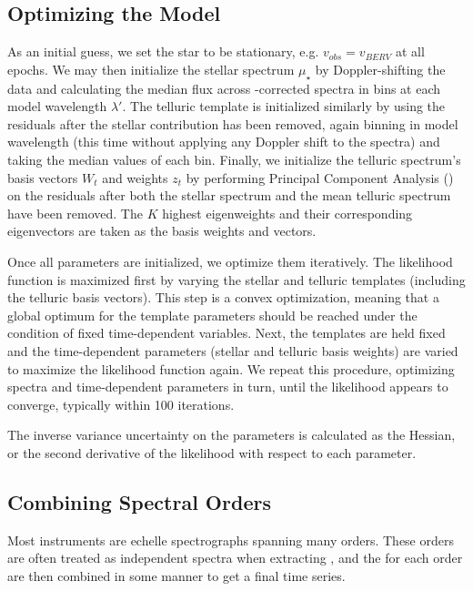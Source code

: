 \documentclass[modern]{aastex62}
\begin{document}
\subsection{Optimizing the Model}
\label{s:optimizing}

As an initial guess, we set the star to be stationary, e.g. $v_{obs} = v_{BERV}$ at all epochs. 
We may then initialize the stellar spectrum $\mu_{\star}$ by Doppler-shifting the data and calculating the median flux across \BERV-corrected spectra in bins at each model wavelength $\lambda'$. 
The telluric template is initialized similarly by using the residuals after the stellar contribution has been removed, again binning in model wavelength (this time without applying any Doppler shift to the spectra) and taking the median values of each bin. 
Finally, we initialize the telluric spectrum's basis vectors $W_t$ and weights $z_t$ by performing Principal Component Analysis () on the residuals after both the stellar spectrum and the mean telluric spectrum have been removed. 
The $K$ highest eigenweights and their corresponding eigenvectors are taken as the basis weights and vectors. 

Once all parameters are initialized, we optimize them iteratively. 
The likelihood function is maximized first by varying the stellar and telluric templates (including the telluric basis vectors). 
This step is a convex optimization, meaning that a global optimum for the template parameters should be reached under the condition of fixed time-dependent variables. 
Next, the templates are held fixed and the time-dependent parameters (stellar \RVs and telluric basis weights) are varied to maximize the likelihood function again. 
We repeat this procedure, optimizing spectra and time-dependent parameters in turn, until the likelihood appears to converge, typically within 100 iterations.

The inverse variance uncertainty on the parameters is calculated as the Hessian, or the second derivative of the likelihood with respect to each parameter. 

\subsection{Combining Spectral Orders}
\label{s:combining-orders}

Most \EPRV instruments are echelle spectrographs spanning many orders. 
These orders are often treated as independent spectra when extracting \RVs, and the \RVs for each order are then combined in some manner to get a final time series. 
\end{document}
